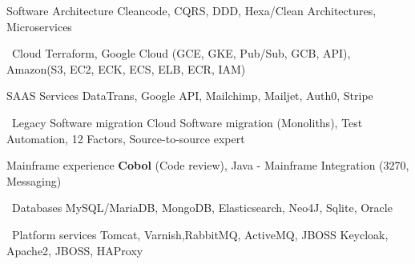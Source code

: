 \begin{cvskills}


  \cvskill
  {Software Architecture} %
  {Cleancode, CQRS, DDD, Hexa/Clean Architectures, Microservices} %

  \cvskill
  {\Cloud\ Cloud} %
  {Terraform, Google Cloud (GCE, GKE, Pub/Sub, GCB, API), Amazon(S3, EC2, ECK, ECS, ELB, ECR, IAM)} %

  \cvskill
  {SAAS Services} %
  {DataTrans, Google API, Mailchimp, Mailjet, Auth0, Stripe} %


  \cvskill
  {\faCogs\ Legacy Software migration} %
  {Cloud Software migration (Monoliths), Test Automation, 12 Factors, Source-to-source expert} %
  
  \cvskill
  {Mainframe experience} %
  {\textbf{Cobol} (Code review), Java - Mainframe Integration (3270, Messaging)} %


  \cvskill
  {\faDatabase\ Databases} %
  {MySQL/MariaDB, MongoDB, Elasticsearch, Neo4J, Sqlite, Oracle} %
  

  \cvskill
  {\faServer\ Platform services} %
  {Tomcat, Varnish,RabbitMQ, ActiveMQ, JBOSS Keycloak, Apache2, JBOSS, HAProxy} %

\end{cvskills}






